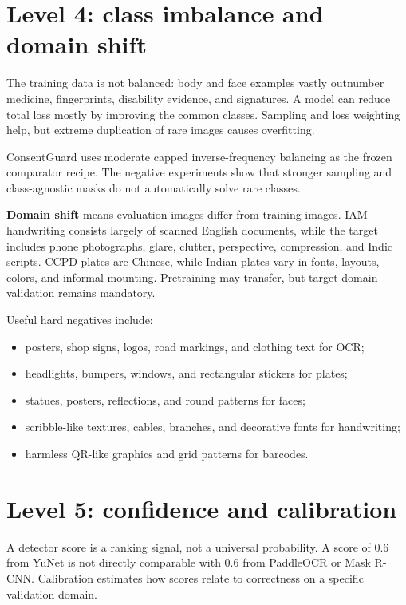 \section{Level 4: class imbalance and domain shift}

The training data is not balanced: body and face examples vastly outnumber medicine, fingerprints, disability evidence, and signatures. A model can reduce total loss mostly by improving the common classes. Sampling and loss weighting help, but extreme duplication of rare images causes overfitting.

ConsentGuard uses moderate capped inverse-frequency balancing as the frozen comparator recipe. The negative experiments show that stronger sampling and class-agnostic masks do not automatically solve rare classes.

\textbf{Domain shift} means evaluation images differ from training images. IAM handwriting consists largely of scanned English documents, while the target includes phone photographs, glare, clutter, perspective, compression, and Indic scripts. CCPD plates are Chinese, while Indian plates vary in fonts, layouts, colors, and informal mounting. Pretraining may transfer, but target-domain validation remains mandatory.

Useful hard negatives include:

\begin{itemize}[leftmargin=6mm]
  \item posters, shop signs, logos, road markings, and clothing text for OCR;
  \item headlights, bumpers, windows, and rectangular stickers for plates;
  \item statues, posters, reflections, and round patterns for faces;
  \item scribble-like textures, cables, branches, and decorative fonts for handwriting;
  \item harmless QR-like graphics and grid patterns for barcodes.
\end{itemize}

\section{Level 5: confidence and calibration}

A detector score is a ranking signal, not a universal probability. A score of 0.6 from YuNet is not directly comparable with 0.6 from PaddleOCR or Mask R-CNN. Calibration estimates how scores relate to correctness on a specific validation domain.

